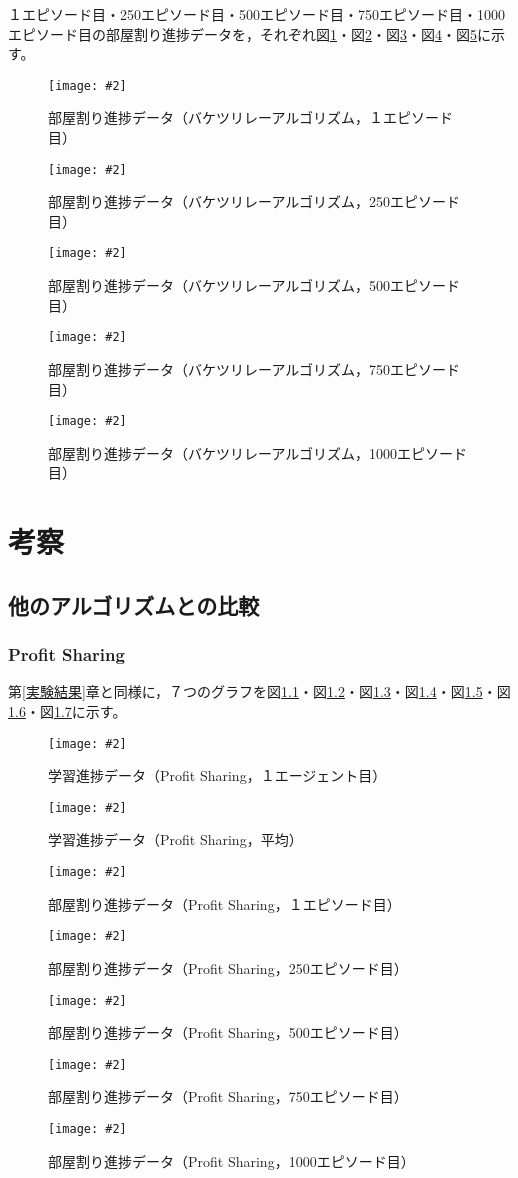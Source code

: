 \documentclass[titlepage]{ltjsreport}
\newcommand{\image}[2]{\begin{figure}[h]\vspace{1em}\begin{center}\texttt{[image: \#2]}\caption{#1}\label{#1}\end{center}\end{figure}}
\begin{document}
１エピソード目・250エピソード目・500エピソード目・750エピソード目・1000エピソード目の部屋割り進捗データを，それぞれ図\ref{部屋割り進捗データ（バケツリレーアルゴリズム，１エピソード目）}・図\ref{部屋割り進捗データ（バケツリレーアルゴリズム，250エピソード目）}・図\ref{部屋割り進捗データ（バケツリレーアルゴリズム，500エピソード目）}・図\ref{部屋割り進捗データ（バケツリレーアルゴリズム，750エピソード目）}・図\ref{部屋割り進捗データ（バケツリレーアルゴリズム，1000エピソード目）}に示す。
\image{部屋割り進捗データ（バケツリレーアルゴリズム，１エピソード目）}{外部ファイル/部屋割り進捗データ/バケツリレーアルゴリズム/１エピソード目}
\image{部屋割り進捗データ（バケツリレーアルゴリズム，250エピソード目）}{外部ファイル/部屋割り進捗データ/バケツリレーアルゴリズム/250エピソード目}
\image{部屋割り進捗データ（バケツリレーアルゴリズム，500エピソード目）}{外部ファイル/部屋割り進捗データ/バケツリレーアルゴリズム/500エピソード目}
\image{部屋割り進捗データ（バケツリレーアルゴリズム，750エピソード目）}{外部ファイル/部屋割り進捗データ/バケツリレーアルゴリズム/750エピソード目}
\image{部屋割り進捗データ（バケツリレーアルゴリズム，1000エピソード目）}{外部ファイル/部屋割り進捗データ/バケツリレーアルゴリズム/1000エピソード目}
\chapter{考察}
\section{他のアルゴリズムとの比較}
\subsection{Profit Sharing}
\label{Profit Sharingとの比較}
第\ref{実験結果}章と同様に，７つのグラフを図\ref{学習進捗データ（Profit Sharing，１エージェント目）}・図\ref{学習進捗データ（Profit Sharing，平均）}・図\ref{部屋割り進捗データ（Profit Sharing，１エピソード目）}・図\ref{部屋割り進捗データ（Profit Sharing，250エピソード目）}・図\ref{部屋割り進捗データ（Profit Sharing，500エピソード目）}・図\ref{部屋割り進捗データ（Profit Sharing，750エピソード目）}・図\ref{部屋割り進捗データ（Profit Sharing，1000エピソード目）}に示す。
\image{学習進捗データ（Profit Sharing，１エージェント目）}{外部ファイル/学習進捗データ/Profit-Sharing/１エージェント目.png}
\image{学習進捗データ（Profit Sharing，平均）}{外部ファイル/学習進捗データ/Profit-Sharing/平均.png}
\image{部屋割り進捗データ（Profit Sharing，１エピソード目）}{外部ファイル/部屋割り進捗データ/Profit-Sharing/１エピソード目}
\image{部屋割り進捗データ（Profit Sharing，250エピソード目）}{外部ファイル/部屋割り進捗データ/Profit-Sharing/250エピソード目}
\image{部屋割り進捗データ（Profit Sharing，500エピソード目）}{外部ファイル/部屋割り進捗データ/Profit-Sharing/500エピソード目}
\image{部屋割り進捗データ（Profit Sharing，750エピソード目）}{外部ファイル/部屋割り進捗データ/Profit-Sharing/750エピソード目}
\image{部屋割り進捗データ（Profit Sharing，1000エピソード目）}{外部ファイル/部屋割り進捗データ/Profit-Sharing/1000エピソード目}
\end{document}
